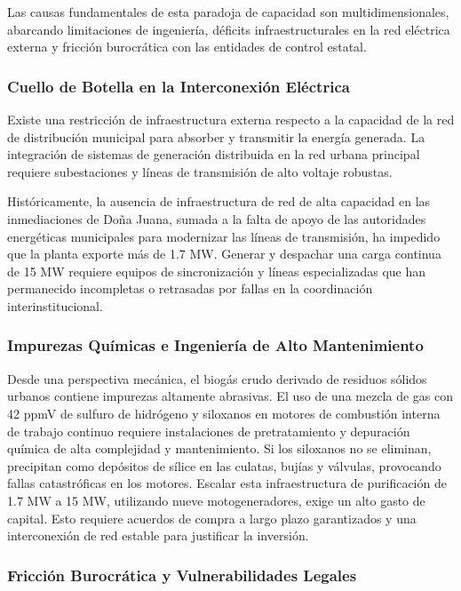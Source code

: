 \documentclass[11pt,letterpaper]{article}
\begin{document}
Las causas fundamentales de esta paradoja de capacidad son multidimensionales,
abarcando limitaciones de ingeniería, déficits infraestructurales en la red
eléctrica externa y fricción burocrática con las entidades de control estatal.

\subsubsection{Cuello de Botella en la Interconexión Eléctrica}

Existe una restricción de infraestructura externa respecto a la capacidad de la
red de distribución municipal para absorber y transmitir la energía generada.
La integración de sistemas de generación distribuida en la red urbana principal
requiere subestaciones y líneas de transmisión de alto voltaje robustas.

Históricamente, la ausencia de infraestructura de red de alta capacidad en
las inmediaciones de Doña Juana, sumada a la falta de apoyo de las
autoridades energéticas municipales para modernizar las líneas de
transmisión, ha impedido que la planta exporte más de 1.7 MW. Generar y
despachar una carga continua de 15 MW requiere equipos de sincronización y
líneas especializadas que han permanecido incompletas o retrasadas por
fallas en la coordinación interinstitucional.

\subsubsection{Impurezas Químicas e Ingeniería de Alto Mantenimiento}

Desde una perspectiva mecánica, el biogás crudo derivado de residuos sólidos
urbanos contiene impurezas altamente abrasivas. El uso de una mezcla de gas con
42 ppmV de sulfuro de hidrógeno y siloxanos en motores de combustión interna de
trabajo continuo requiere instalaciones de pretratamiento y depuración química
de alta complejidad y mantenimiento.  Si los siloxanos no se eliminan,
precipitan como depósitos de sílice en las culatas, bujías y válvulas,
provocando fallas catastróficas en los motores. Escalar esta infraestructura de
purificación de 1.7 MW a 15 MW, utilizando nueve motogeneradores, exige un alto
gasto de capital. Esto requiere acuerdos de compra a largo plazo garantizados y
una interconexión de red estable para justificar la inversión.

\subsubsection{Fricción Burocrática y Vulnerabilidades Legales}
\end{document}
